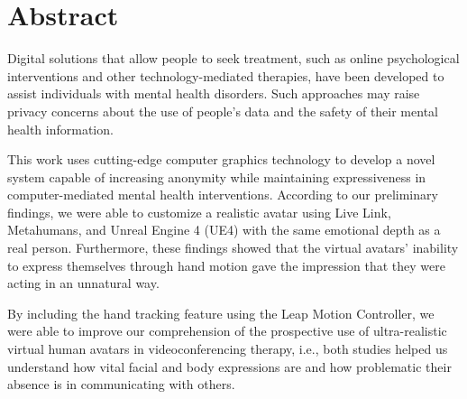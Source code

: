 \chapter*{Abstract}
\justify
Digital solutions that allow people to seek treatment, such as online psychological interventions and other technology-mediated therapies, have been developed to assist individuals with mental health disorders. Such approaches may raise privacy concerns about the use of people's data and the safety of their mental health information.

This work uses cutting-edge computer graphics technology to develop a novel system capable of increasing anonymity while maintaining expressiveness in computer-mediated mental health interventions. According to our preliminary findings, we were able to customize a realistic avatar using Live Link, Metahumans, and Unreal Engine 4 (UE4) with the same emotional depth as a real person. Furthermore, these findings showed that the virtual avatars' inability to express themselves through hand motion gave the impression that they were acting in an unnatural way.

By including the hand tracking feature using the Leap Motion Controller, we were able to improve our comprehension of the prospective use of ultra-realistic virtual human avatars in videoconferencing therapy, i.e., both studies helped us understand how vital facial and body expressions are and how problematic their absence is in communicating with others.

